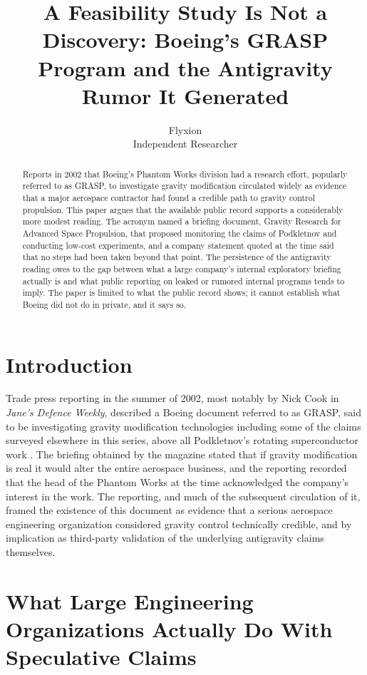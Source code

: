 \documentclass[11pt]{article}
\title{A Feasibility Study Is Not a Discovery: Boeing's GRASP Program and the Antigravity Rumor It Generated}
\author{Flyxion \\ \small Independent Researcher}
\date{}
\begin{document}
\maketitle

\begin{abstract}
Reports in 2002 that Boeing's Phantom Works division had a research effort, popularly referred to as GRASP, to investigate gravity modification circulated widely as evidence that a major aerospace contractor had found a credible path to gravity control propulsion. This paper argues that the available public record supports a considerably more modest reading. The acronym named a briefing document, Gravity Research for Advanced Space Propulsion, that proposed monitoring the claims of Podkletnov and conducting low-cost experiments, and a company statement quoted at the time said that no steps had been taken beyond that point. The persistence of the antigravity reading owes to the gap between what a large company's internal exploratory briefing actually is and what public reporting on leaked or rumored internal programs tends to imply. The paper is limited to what the public record shows; it cannot establish what Boeing did not do in private, and it says so.
\end{abstract}

\section{Introduction}

Trade press reporting in the summer of 2002, most notably by Nick Cook in \emph{Jane's Defence Weekly}, described a Boeing document referred to as GRASP, said to be investigating gravity modification technologies including some of the claims surveyed elsewhere in this series, above all Podkletnov's rotating superconductor work \cite{Cook2002}. The briefing obtained by the magazine stated that if gravity modification is real it would alter the entire aerospace business, and the reporting recorded that the head of the Phantom Works at the time acknowledged the company's interest in the work. The reporting, and much of the subsequent circulation of it, framed the existence of this document as evidence that a serious aerospace engineering organization considered gravity control technically credible, and by implication as third-party validation of the underlying antigravity claims themselves.

\section{What Large Engineering Organizations Actually Do With Speculative Claims}
\end{document}
